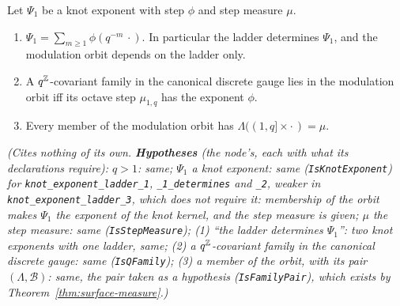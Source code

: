 \begin{lemma}
\label{lem:knot-exponent-ladder}
\leanok
{}
Let $\Psi_1$ be a knot exponent with step $\phi$ and step measure $\mu$.
\begin{enumerate}
\item $\Psi_1 = \sum_{m \ge 1}\phi(q^{-m}\,\cdot)$. In particular the ladder determines $\Psi_1$,
and the modulation orbit depends on the ladder only.
\item A $q^{\mathbb{Z}}$-covariant family in the canonical discrete gauge lies in the modulation orbit iff
its octave step $\mu_{1,q}$ has the exponent $\phi$.
\item Every member of the modulation orbit has $\Lambda((1,q] \times \cdot\,) = \mu$.
\end{enumerate}
\statusT\quad\emph{(Cites nothing of its own. \textbf{Hypotheses} (the node's, each with what its
declarations require): $q > 1$: same; $\Psi_1$ a knot exponent: same (\texttt{IsKnotExponent}) for
\texttt{knot\_exponent\_ladder\_1}, \texttt{\_1\_determines} and \texttt{\_2}, weaker in
\texttt{knot\_exponent\_ladder\_3}, which does not require it: membership of the orbit makes $\Psi_1$ the
exponent of the knot kernel, and the step measure is given; $\mu$ the step measure: same
(\texttt{IsStepMeasure}); (1) ``the ladder determines $\Psi_1$'': two knot exponents with one ladder,
same; (2) a $q^{\mathbb{Z}}$-covariant family in the canonical discrete gauge: same (\texttt{IsQFamily});
(3) a member of the orbit, with its pair $(\Lambda, \mathcal{B})$: same, the pair taken as a
hypothesis (\texttt{IsFamilyPair}), which exists by Theorem~\ref{thm:surface-measure}.)}
\end{lemma}

